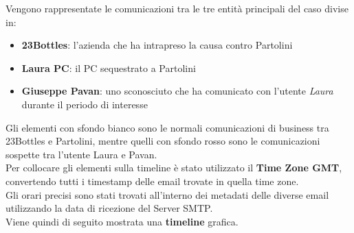 Vengono rappresentate le comunicazioni tra le tre entità principali del caso divise in:
\begin{itemize}
    \item \textbf{23Bottles}: l'azienda che ha intrapreso la causa contro Partolini
    \item \textbf{Laura PC}: il PC sequestrato a Partolini
    \item \textbf{Giuseppe Pavan}: uno sconosciuto che ha comunicato con l'utente \textit{Laura} durante il periodo di interesse
\end{itemize}
Gli elementi con sfondo bianco sono le normali comunicazioni  di business tra 23Bottles e Partolini, mentre quelli con sfondo rosso sono  le comunicazioni sospette tra l'utente Laura e Pavan.\vspace{14pt}\\
Per collocare gli elementi sulla timeline è stato utilizzato il \textbf{Time Zone GMT}, convertendo tutti i timestamp delle email trovate in quella time zone.\\
Gli orari precisi sono stati trovati all'interno dei metadati delle diverse email utilizzando la data di ricezione del Server SMTP.\vspace{14pt}\\
Viene quindi di seguito mostrata una \textbf{timeline} grafica.